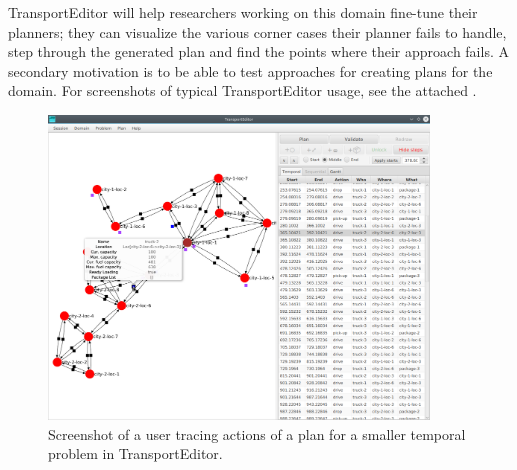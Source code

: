 TransportEditor will help researchers working on this domain fine-tune their planners; they can visualize the various corner cases their planner fails to handle, step through the generated plan and find the points where their approach fails.
A secondary motivation is to be able to test approaches for creating plans for the domain.
For screenshots of typical TransportEditor usage, see the attached .

\begin{figure}[tbp]
\begin{center}
\includegraphics[width=0.9\textwidth]{../img/transporteditor_temporal}
\end{center}
\caption{Screenshot of a user tracing actions of a plan for a smaller temporal problem in TransportEditor.}
\label{fig:transporteditor-screenshot}
\end{figure}

